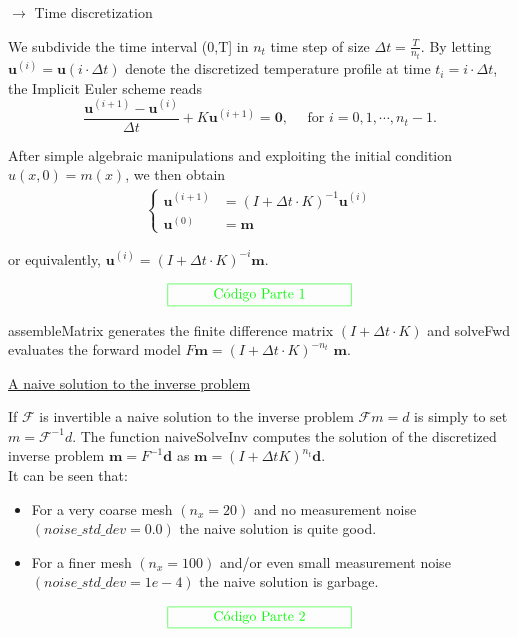 \documentclass{beamer}
\begin{document}
\begin{frame}

{\color{red} $\longrightarrow$ Time discretization}

We subdivide the time interval (0,T] in $n_t$ time step of size $\Delta t=\frac{T}{n_t}$. By letting $\mathbf{u}^{(i)}=\mathbf{u}(i\cdot\Delta t)$ denote the discretized temperature profile at time $t_i=i \cdot \Delta t$, the Implicit Euler scheme reads $$\frac{\mathbf{u}^{(i+1)}-\mathbf{u}^{(i)}}{ \Delta t} + K\mathbf{u}^{(i+1)}=\mathbf{0}, \quad \mbox{ for } i=0,1,\cdots, n_t - 1.$$

After simple algebraic manipulations and exploiting the initial condition $u(x,0)=m(x)$, we then obtain 
\begin{eqnarray*}
\left\{
\begin{aligned}
\mathbf{u}^{(i+1)} &= (I+\Delta t \cdot K)^{-1 }\mathbf{u}^{(i)}  \\
\mathbf{u}^{(0)} &=\mathbf{ m} 
\end{aligned}
\right.
\end{eqnarray*}

or equivalently, $\mathbf{u}^{(i)}=(I+ \Delta t \cdot  K)^{-i}\mathbf{m}$.

$${\color{green} \framebox[2\width]{C\'odigo Parte 1}}$$

{\color{cyan} assembleMatrix} generates the finite difference matrix $(I+\Delta  t \cdot K)$ and {\color{cyan} solveFwd} evaluates the forward model $F\mathbf{m}= (I+\Delta t \cdot K)^{-n_t}$ $\mathbf{m}$.
\end{frame}

\begin{frame}
{\color{red} \underline{A naive solution to the inverse problem}}

If $\mathcal{F}$ is invertible a naive solution to the inverse problem $\mathcal{F}m=d$ is simply to set $m=\mathcal{F}^{-1}d$. The function {\color{cyan}naiveSolveInv} computes the solution of the discretized inverse problem $\mathbf{m}=F^{-1}\mathbf{d}$ as $\mathbf{m}=(I+\Delta t K)^{n_t} \mathbf{d}$. \\

It can be seen that:

\begin{itemize}
\item For a very coarse mesh $(n_x = 20)$ and no measurement noise $(noise\_std\_dev = 0.0)$ the naive solution is quite good.
\item For a finer mesh $(n_x = 100)$ and/or even small measurement noise $(noise\_std\_dev = 1e-4)$ the naive solution is garbage.
\end{itemize}
$${\color{green} \framebox[2\width]{C\'odigo Parte 2}}$$
\end{frame}
\end{document}
